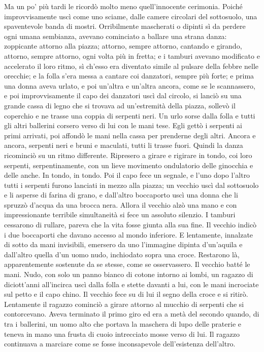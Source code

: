 \documentclass[
a5paper, %
10pt, %
twoside, 
onecolumn, %
openany, %
]{memoir}
\begin{document}
Ma un po’ più tardi le ricordò molto meno quell’innocente cerimonia. Poiché improvvisamente uscì come uno sciame, dalle camere circolari del sottosuolo, una spaventevole banda di mostri. Orribilmente mascherati o dipinti sì da perdere ogni umana sembianza, avevano cominciato a ballare una strana danza: zoppicante attorno alla piazza; attorno, sempre attorno, cantando e girando, attorno, sempre attorno, ogni volta più in fretta; e i tamburi avevano modificato e accelerato il loro ritmo, sì ch’esso era diventato simile al pulsare della febbre nelle orecchie; e la folla s’era messa a cantare coi danzatori, sempre più forte; e prima una donna aveva urlato, e poi un’altra e un’altra ancora, come se le scannassero, e poi improvvisamente il capo dei danzatori uscì dal circolo, si lanciò su una grande cassa di legno che si trovava ad un’estremità della piazza, sollevò il coperchio e ne trasse una coppia di serpenti neri. Un urlo sorse dalla folla e tutti gli altri ballerini corsero verso di lui con le mani tese. Egli gettò i serpenti ai primi arrivati, poi affondò le mani nella cassa per prenderne degli altri. Ancora e ancora, serpenti neri e bruni e maculati, tutti li trasse fuori. Quindi la danza ricominciò su un ritmo differente. Ripresero a girare e rigirare in tondo, coi loro serpenti, serpentinamente, con un lieve movimento ondulatorio delle ginocchia e delle anche. In tondo, in tondo. Poi il capo fece un segnale, e l’uno dopo l’altro tutti i serpenti furono lanciati in mezzo alla piazza; un vecchio uscì dal sottosuolo e li asperse di farina di grano, e dall’altro boccaporto uscì una donna che li spruzzò d’acqua da una brocca nera. Allora il vecchio alzò una mano e con impressionante terribile simultaneità si fece un assoluto silenzio. I tamburi cessarono di rullare, pareva che la vita fosse giunta alla sua fine. Il vecchio indicò i due boccaporti che davano accesso al mondo inferiore. E lentamente, innalzate di sotto da mani invisibili, emersero da uno l’immagine dipinta d’un’aquila e dall’altro quella d’un uomo nudo, inchiodato sopra una croce. Restarono là, apparentemente sostenute da se stesse, come se osservassero. Il vecchio batté le mani. Nudo, con solo un panno bianco di cotone intorno ai lombi, un ragazzo di diciott’anni all’incirca uscì dalla folla e stette davanti a lui, con le mani incrociate sul petto e il capo chino. Il vecchio fece su di lui il segno della croce e si ritirò. Lentamente il ragazzo cominciò a girare attorno al mucchio di serpenti che si contorcevano. Aveva terminato il primo giro ed era a metà del secondo quando, di tra i ballerini, un uomo alto che portava la maschera di lupo delle praterie e teneva in mano una frusta di cuoio intrecciato mosse verso di lui. Il ragazzo continuava a marciare come se fosse inconsapevole dell’esistenza dell’altro.
\end{document}
